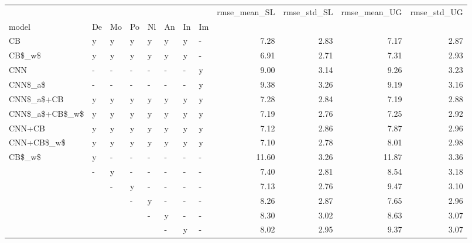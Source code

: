 \begin{tabular}{llllllllrrrr}
\toprule
       &   &   &   &   &   &   &   &  rmse\_mean\_SL &  rmse\_std\_SL &  rmse\_mean\_UG &  rmse\_std\_UG \\
model & De & Mo & Po & Nl & An & In & Im &               &              &               &              \\
\midrule
CB & y & y & y & y & y & y & - &          7.28 &         2.83 &          7.17 &         2.87 \\
CB\$\_w\$ & y & y & y & y & y & y & - &          6.91 &         2.71 &          7.31 &         2.93 \\
CNN & - & - & - & - & - & - & y &          9.00 &         3.14 &          9.26 &         3.23 \\
CNN\$\_a\$ & - & - & - & - & - & - & y &          9.38 &         3.26 &          9.19 &         3.16 \\
CNN\$\_a\$+CB & y & y & y & y & y & y & y &          7.28 &         2.84 &          7.19 &         2.88 \\
CNN\$\_a\$+CB\$\_w\$ & y & y & y & y & y & y & y &          7.19 &         2.76 &          7.25 &         2.92 \\
CNN+CB & y & y & y & y & y & y & y &          7.12 &         2.86 &          7.87 &         2.96 \\
CNN+CB\$\_w\$ & y & y & y & y & y & y & y &          7.10 &         2.78 &          8.01 &         2.98 \\
CB\$\_w\$ & y & - & - & - & - & - & - &         11.60 &         3.26 &         11.87 &         3.36 \\
       & - & y & - & - & - & - & - &          7.40 &         2.81 &          8.54 &         3.18 \\
       &   & - & y & - & - & - & - &          7.13 &         2.76 &          9.47 &         3.10 \\
       &   &   & - & y & - & - & - &          8.26 &         2.87 &          7.65 &         2.96 \\
       &   &   &   & - & y & - & - &          8.30 &         3.02 &          8.63 &         3.07 \\
       &   &   &   &   & - & y & - &          8.02 &         2.95 &          9.37 &         3.07 \\
\bottomrule
\end{tabular}
